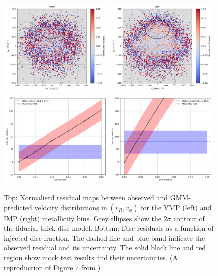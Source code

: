 \documentclass[a4paper,12pt]{article}
\begin{document}
\begin{figure}[H]
    \centering
    \includegraphics[width=0.49\textwidth]{../figures/vmp_residual_map.png}
    \includegraphics[width=0.49\textwidth]{../figures/imp_residual_map.png} \\
    \includegraphics[width=0.49\textwidth]{../figures/vmp_disc_fraction.png}
    \includegraphics[width=0.49\textwidth]{../figures/imp_disc_fraction.png}
    \caption{Top: Normalised residual maps between observed and GMM-predicted 
    velocity distributions in $(v_R, v_\phi)$ for the VMP (left) and IMP (right) metallicity bins. 
    Grey ellipses show the $2\sigma$ contour of the fiducial thick disc model. Bottom: Disc residuals 
    as a function of injected disc fraction. The dashed line and blue band indicate the observed residual
     and its uncertainty. The solid black line and red region show mock test results and their uncertainties.
     (A reproduction of Figure 7 from \citet{zhang2024existencemetalpoordiscmilky})}
    \label{fig:residuals}
\end{figure}
\end{document}

